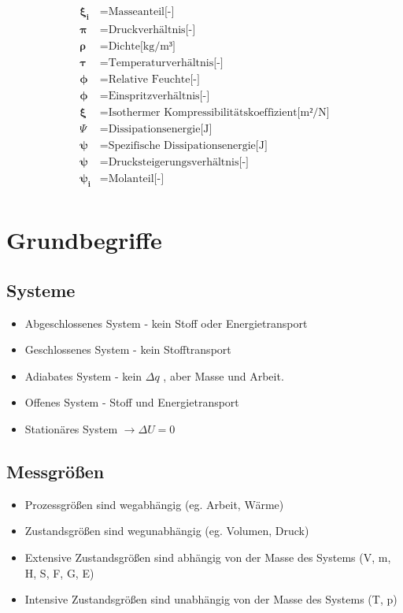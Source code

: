 \documentclass[twocolumn]{article}
\begin{document}
\begin{align*}
	\mathbf{\xi_i}		&=	\text{Masseanteil[-]} \\
	\mathbf{\pi}		&=	\text{Druckverhältnis[-]} \\
	\mathbf{\rho}		&=	\text{Dichte[kg/m³]} \\
	\mathbf{\tau}		&=	\text{Temperaturverhältnis[-]} \\
	\mathbf{\phi}		&=	\text{Relative Feuchte[-]} \\
	\mathbf{\phi}		&=	\text{Einspritzverhältnis[-]} \\
	\mathbf{\xi}		&=	\text{Isothermer Kompressibilitätskoeffizient[m²/N]} \\
	\Psi			&=	\text{Dissipationsenergie[J]} \\
	\mathbf{\psi}		&=	\text{Spezifische Dissipationsenergie[J]} \\
	\mathbf{\psi}		&=	\text{Drucksteigerungsverhältnis[-]} \\
	\mathbf{\psi_i}		&=	\text{Molanteil[-]} \\
\end{align*}

\pagebreak 

\section{Grundbegriffe}
\subsection*{Systeme}
\begin{itemize}
	\item Abgeschlossenes System - kein Stoff oder Energietransport
	\item Geschlossenes System - kein Stofftransport
	\item Adiabates System - kein $\Delta q$ , aber Masse und Arbeit.
	\item Offenes System - Stoff und Energietransport
	\item Stationäres System $\rightarrow \Delta U = 0$
\end{itemize}

\subsection*{Messgrößen}
\begin{itemize}
	\item Prozessgrößen sind wegabhängig (eg. Arbeit, Wärme)
	\item Zustandsgrößen sind wegunabhängig (eg. Volumen, Druck)
	\item Extensive Zustandsgrößen sind abhängig von der Masse des Systems (V, m, H, S, F, G, E)
	\item Intensive Zustandsgrößen sind unabhängig von der Masse des Systems (T, p)
\end{itemize}
\end{document}
